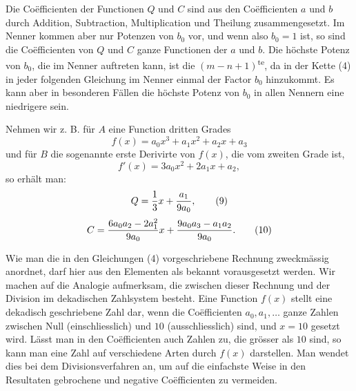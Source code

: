 
Die Coëfficienten der Functionen $Q$ und $C$ sind aus den
Coëfficienten $a$ und $b$ durch Addition, Subtraction, Multiplication
und Theilung zusammengesetzt. Im Nenner kommen aber nur Potenzen von
$b_0$ vor, und wenn also $b_0=1$ ist, so sind die Coëfficienten von
$Q$ und $C$ ganze Functionen der $a$ und $b$. Die höchste Potenz von
$b_0$, die im Nenner auftreten kann, ist die
$(m-n+1)$\textsuperscript{te}, da in der Kette (4) in jeder folgenden
Gleichung im Nenner einmal der Factor $b_0$ hinzukommt. Es kann aber
in besonderen Fällen die höchste Potenz von $b_0$ in allen Nennern
eine niedrigere sein.

Nehmen wir z. B. für $A$ eine Function dritten Grades
\begin{equation}
 f(x)=a_0x^3+a_1x^2+a_2x+a_3
\tag{7}
\end{equation}
und für $B$ die sogenannte erste Derivirte von $f(x)$, die vom zweiten
Grade ist,
\begin{equation}
 f'(x)=3a_0x^2+2a_1x+a_2,
\tag{8}
\end{equation}
so erhält man:
\begin{equation}
 Q={1\over 3}x+{a_1\over 9a_0},
\tag{9}
\end{equation}
\begin{equation}
 C={6a_0a_2-2a_1^2\over 9a_0}x
   +{9a_0a_3-a_1a_2\over 9a_0}.
\tag{10}
\end{equation}

Wie man die in den Gleichungen (4) vorgeschriebene Rechnung
zweckmässig anordnet, darf hier aus den Elementen als bekannt
vorausgesetzt werden. Wir machen auf die Analogie aufmerksam, die
zwischen dieser Rechnung und der Division im dekadischen Zahlsystem
besteht. Eine Function $f(x)$ stellt eine dekadisch geschriebene Zahl
dar, wenn die Coëfficienten $a_0,a_1,\ldots$ ganze Zahlen zwischen Null
(einschliesslich) und $10$ (ausschliesslich) sind, und $x=10$ gesetzt
wird. Lässt man in den Coëfficienten auch Zahlen zu, die grösser als
$10$ sind, so kann man eine Zahl auf verschiedene Arten durch $f(x)$
darstellen. Man wendet dies bei dem Divisionsverfahren an, um auf die
einfachste Weise in den Resultaten gebrochene und negative
Coëfficienten zu vermeiden.
